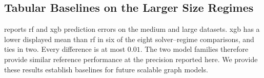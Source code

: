 \subsection{Tabular Baselines on the Larger Size Regimes}
\label{sec:ch07:larger-results}
 reports \gls{rf} and \gls{xgb} prediction errors on the medium and large datasets. \gls{xgb} has a lower displayed mean than \gls{rf} in six of the eight solver--regime comparisons, and ties in two. Every difference is at most $0.01$. The two model families therefore provide similar reference performance at the precision reported here. We provide these results establish baselines for future scalable graph models.

\begin{table}[htbp]
\caption[Performance prediction on medium and large  instances]{\gls{rmse} (log\textsubscript{10} time) for performance prediction on  and  \gls{sat} instances. Lower is better.}
\label{tab:ch07:sat_epm_res_med_large}
\label{tab:ch07:sat_epm_res_med}
\label{tab:ch07:sat_epm_res_large}

  \tabledefaults
  \centering


  \begin{minipage}{0.48\textwidth}
    \centering


\end{minipage}
\end{table}
